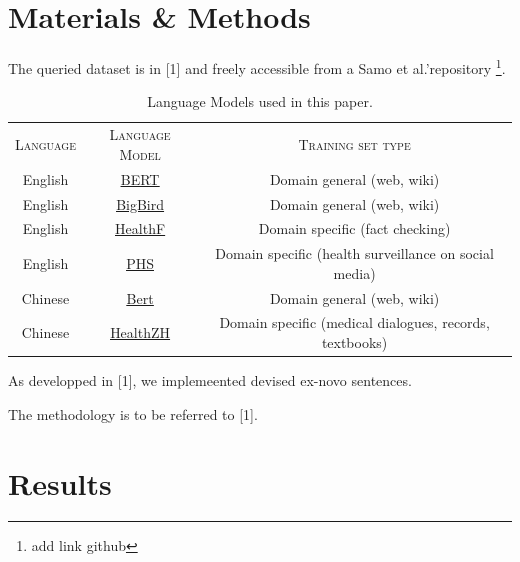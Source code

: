 \documentclass{IOS-Book-Article}
\begin{document}
\section{Materials \& Methods}

The queried dataset is in [1] and freely accessible from a Samo et al.'repository \footnote{add link github}. 

\begin{table}[]
    \centering
    \begin{tabular}{c|c|c}
         \textsc{Language} & \textsc{Language Model} & \textsc{Training set type}\\
         English & \href{https://huggingface.co/docs/transformers/model_doc/bert}{\underline{BERT}} & Domain general (web, wiki)\\
         English & \href{https://huggingface.co/docs/transformers/model_doc/big_bird}{\underline{BigBird}} & Domain general (web, wiki)\\
         English & \href{https://huggingface.co/austinmw/distilbert-base-uncased-finetuned-health_facts}{\underline{HealthF}} & Domain specific (fact checking)\\
         English & \href{https://huggingface.co/publichealthsurveillance/PHS-BERT}{\underline{PHS}} & Domain specific (health surveillance on social media)\\
         Chinese & \href{https://huggingface.co/bert-base-chinese}{\underline{Bert}} & Domain general (web, wiki)\\
         Chinese & \href{https://huggingface.co/nghuyong/ernie-health-zh}{\underline{HealthZH}} & Domain specific (medical dialogues, records, textbooks)\\
         
    \end{tabular}
    \caption{Language Models used in this paper.}
    \label{tab:my_label}
\end{table}

As developped in [1], we implemeented devised ex-novo sentences. 

The methodology is to be referred to [1].

\section{Results}
\end{document}
